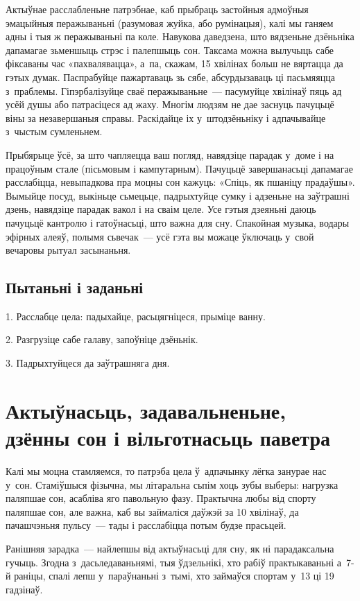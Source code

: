 Актыўнае расслабленьне патрэбнае, каб прыбраць застойныя адмоўныя эмацыйныя перажываньні (разумовая жуйка, або румінацыя), калі мы ганяем адны і тыя ж перажываньні па коле. Навукова даведзена, што вядзеньне дзёньніка дапамагае зьменшыць стрэс і палепшыць сон. Таксама можна вылучыць сабе фіксаваны час «пахвалявацца», а~па, скажам, 15 хвілінах больш не вяртацца да гэтых думак. Паспрабуйце пажартаваць зь сябе, абсурдызаваць ці пасьмяяцца з~праблемы. Гіпэрбалізуйце сваё перажываньне~--- пасумуйце хвілінаў пяць ад усёй душы або патрасіцеся ад жаху. Многім людзям не дае заснуць пачуцьцё віны за незавершаныя справы. Раскідайце іх у~штодзёньніку і адпачывайце з~чыстым сумленьнем.

Прыбярыце ўсё, за што чапляецца ваш погляд, навядзіце парадак у~доме і на працоўным стале (пісьмовым і кампутарным). Пачуцьцё завершанасьці дапамагае расслабіцца, невыпадкова пра моцны сон кажуць: «Спіць, як пшаніцу прадаўшы». Вымыйце посуд, выкіньце сьмецьце, падрыхтуйце сумку і адзеньне на заўтрашні дзень, навядзіце парадак вакол і на сваім целе. Усе гэтыя дзеяньні даюць пачуцьцё кантролю і гатоўнасьці, што важна для сну. Спакойная музыка, водары эфірных алеяў, полымя сьвечак~--- усё гэта вы можаце ўключаць у~свой вечаровы рытуал засынаньня.

\subsection*{Пытаньні і заданьні}

1. Расслабце цела: падыхайце, расьцягніцеся, прыміце ванну.

2. Разгрузіце сабе галаву, запоўніце дзёньнік.

3. Падрыхтуйцеся да заўтрашняга дня.


\section{Актыўнасьць, задавальненьне, дзённы сон і вільготнасьць паветра}

Калі мы моцна стамляемся, то патрэба цела ў~адпачынку лёгка занурае нас у~сон. Стаміўшыся фізычна, мы літаральна сьпім хоць зубы выберы: нагрузка паляпшае сон, асабліва яго павольную фазу. Практычна любы від спорту паляпшае сон, але важна, каб вы займаліся даўжэй за 10 хвілінаў, да пачашчэньня пульсу~--- тады і расслабіцца потым будзе прасьцей.

Ранішняя зарадка~--- найлепшы від актыўнасьці для сну, як ні парадаксальна гучыць. Згодна з~дасьледаваньнямі, тыя ўдзельнікі, хто рабіў практыкаваньні а~7-й раніцы, спалі лепш у~параўнаньні з~тымі, хто займаўся спортам у~13 ці 19 гадзінаў.


